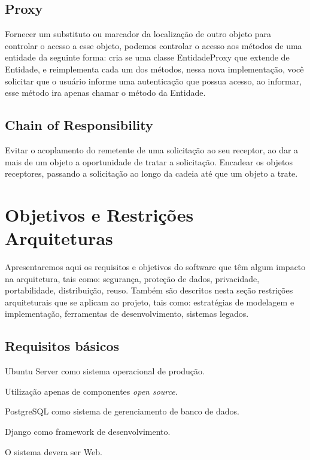 \subsection{Proxy}
Fornecer um substituto ou marcador da localização de outro objeto para controlar 
o acesso a esse objeto, podemos controlar o acesso aos métodos de uma entidade 
da seguinte forma: cria se uma classe EntidadeProxy que extende de Entidade, e 
reimplementa cada um dos métodos, nessa nova implementação, você solicitar que o 
usuário informe uma autenticação que possua acesso, ao informar, esse método ira 
apenas chamar o método da Entidade.   

\subsection{Chain of Responsibility}
Evitar o acoplamento do remetente de uma solicitação ao seu receptor, ao dar a 
mais de um objeto a oportunidade de tratar a solicitação. Encadear os objetos 
receptores, passando a solicitação ao longo da cadeia até que um objeto a trate.

\section{Objetivos e Restrições Arquiteturas}

Apresentaremos aqui os requisitos e objetivos do software que têm algum impacto 
na arquitetura, tais como: segurança, proteção de dados, privacidade, 
portabilidade, distribuição, reuso. Também são descritos nesta seção restrições 
arquiteturais que se aplicam ao projeto, tais  como:  estratégias  de  modelagem e implementação, ferramentas de  desenvolvimento, sistemas legados. 

\subsection{Requisitos básicos}
\begin{alineascomponto}
	\item Ubuntu Server como sistema operacional de produção.
	\item Utilização apenas de componentes \textit{open source}.
	\item PostgreSQL como sistema de gerenciamento de banco de dados.
	\item Django como framework de desenvolvimento.	
	\item O sistema devera ser Web.
\end{alineascomponto}

